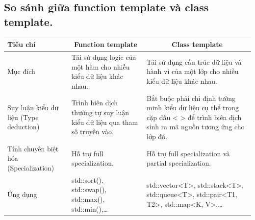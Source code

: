 \subsection{So sánh giữa function template và class template.}
\begin{center}
\renewcommand{\arraystretch}{1.6}
\begin{tabular}{|>{\centering\arraybackslash}m{}|m{}|m{}|}
    \hline
    \textbf{Tiêu chí} & \multicolumn{1}{c|}{\textbf{Function template}} & \multicolumn{1}{c|}{\textbf{Class template}} \\
    \hline
    Mục đích & Tái sử dụng logic của một hàm cho nhiều kiểu dữ liệu khác nhau. & Tái sử dụng cấu trúc dữ liệu và hành vi của một lớp cho nhiều kiểu dữ liệu khác nhau. \\
    \hline
    Suy luận kiểu dữ liệu (Type deduction) & Trình biên dịch thường tự suy luận kiểu dữ liệu qua tham số truyền vào. & Bắt buộc phải chỉ định tường minh kiểu dữ liệu cụ thể trong cặp dấu < > để trình biên dịch sinh ra mã nguồn tương ứng cho lớp đó. \\
    \hline
    Tính chuyên biệt hóa (Specialization) & Hỗ trợ full specialization. & Hỗ trợ full specialization và partial specialization. \\
    \hline
    Ứng dụng & std::sort(), std::swap(), std::max(), std::min(),\dots & std::vector<T>, std::stack<T>, std::queue<T>, std::pair<T1, T2>, std::map<K, V>,\dots \\
    \hline
\end{tabular}
\end{center}